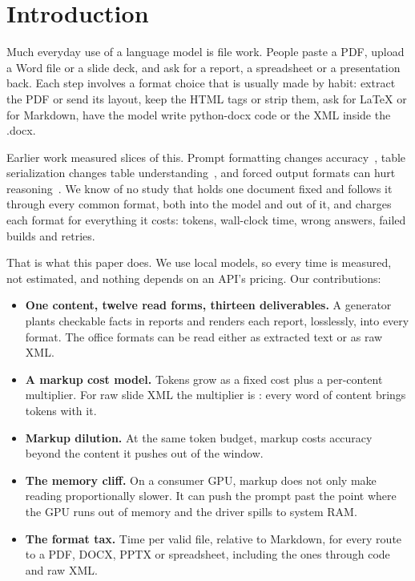 \section{Introduction}
\label{sec:intro}

Much everyday use of a language model is file work. People paste a
PDF, upload a Word file or a slide deck, and ask for a report, a
spreadsheet or a presentation back. Each step involves a format choice
that is usually made by habit: extract the PDF or send its layout, keep
the HTML tags or strip them, ask for LaTeX or for Markdown, have the model
write python-docx code or the XML inside the .docx.

Earlier work measured slices of this. Prompt formatting changes
accuracy~\cite{he2024promptformatting,sclar2024formatting}, table
serialization changes table understanding~\cite{sui2024tablemeetsllm},
and forced output formats can hurt reasoning~\cite{tam2024speakfreely}.
We know of no study that holds one document fixed and follows it through
every common format, both into the model and out of it, and charges each
format for everything it costs: tokens, wall-clock time, wrong answers,
failed builds and retries.

That is what this paper does. We use local models, so every time is
measured, not estimated, and nothing depends on an API's pricing. Our
contributions:
\begin{itemize}
\item \textbf{One content, twelve read forms, thirteen deliverables.} A
  generator plants checkable facts in reports and renders each report,
  losslessly, into every format. The office formats can be read either as
  extracted text or as raw XML.
\item \textbf{A markup cost model.} Tokens grow as a fixed cost plus a
  per-content multiplier. For raw slide XML the multiplier is
  \SlopePptxXml{}: every word of content brings \SlopePptxXml{} tokens with
  it.
\item \textbf{Markup dilution.} At the same token budget, markup costs
  accuracy beyond the content it pushes out of the window.
\item \textbf{The memory cliff.} On a consumer GPU, markup does not only
  make reading proportionally slower. It can push the prompt past the
  point where the GPU runs out of memory and the driver spills to system
  RAM.
\item \textbf{The format tax.} Time per valid file, relative to Markdown,
  for every route to a PDF, DOCX, PPTX or spreadsheet, including the
  ones through code and raw XML.
\end{itemize}
